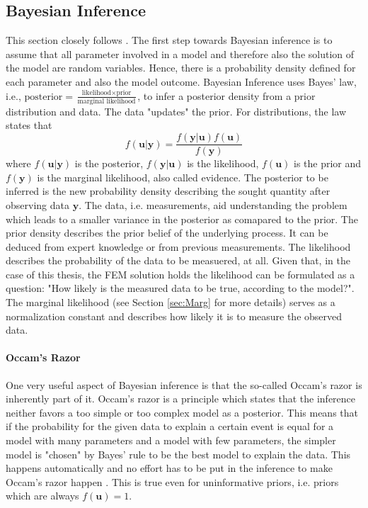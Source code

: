\documentclass[%
  a4paper,oneside,%
  11pt,%
  smallchapters,
  style=printdev,
  extramargin,
  green,%
  rgb, <cmyk>
  ]{tubsbook}
\begin{document}
\subsection{Bayesian Inference}
\label{sec:BayesInf}
This section closely follows \cite{murphy2012, rasmussen2006}.
The first step towards Bayesian inference is to assume that all parameter involved in a model and therefore also the solution of the model are random variables. Hence, there is a probability density defined for each parameter and also the model outcome.
Bayesian Inference uses Bayes' law, i.e., $\text{posterior} = \frac{\text{likelihood} \times \text{prior}}{\text{marginal likelihood}}$, to infer a posterior density from a prior distribution and data. The data "updates" the prior. For distributions, the law states that
\begin{equation}
f(\bm{u}|\bm{y}) = \frac{f(\bm{y}|\bm{u})f(\bm{u})}{f(\bm{y})}
\label{eqn:BayesRule}
\end{equation}
where $f(\bm{u}|\bm{y})$ is the posterior, $f(\bm{y}|\bm{u})$ is the likelihood, $f(\bm{u})$ is the prior and $f(\bm{y})$ is the marginal likelihood, also called evidence. The posterior to be inferred is the new probability density describing the sought quantity after observing data $\bm{y}$. The data, i.e. measurements, aid understanding the problem which leads to a smaller variance in the posterior as comapared to the prior. The prior density describes the prior belief of the underlying process. It can be deduced from expert knowledge or from previous measurements. 
The likelihood describes the probability of the data to be measuered, at all. Given that, in the case of this thesis, the FEM solution holds the likelihood can be formulated as a question: "How likely is the measured data to be true, according to the model?".
The marginal likelihood (see Section \ref{sec:Marg} for more details) serves as a normalization constant and describes how likely it is to measure the observed data.

\paragraph{Occam's Razor}

One very useful aspect of Bayesian inference is that the so-called Occam's razor is inherently part of it. Occam's razor is a principle which states that the inference neither favors a too simple or too complex model as a posterior. This means that if the probability for the given data to explain a certain event is equal for a model with many parameters and a model with few parameters, the simpler model is "chosen" by Bayes' rule to be the best model to explain the data. This happens automatically and no effort has to be put in the inference to make Occam's razor happen \cite{Tipping2004, MacKay1991}. This is true even for uninformative priors, i.e. priors which are always $f(\bm{u})=1$.
\end{document}
